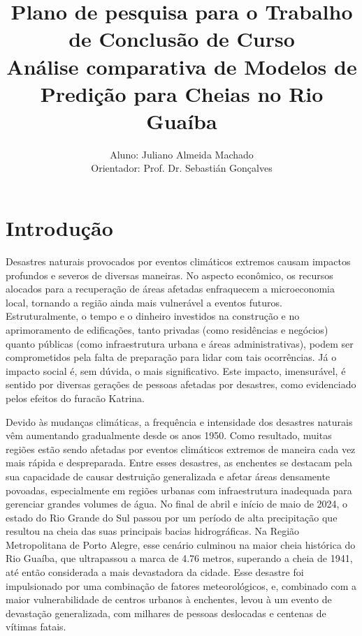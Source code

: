 \documentclass[
	12pt,				%
	openright,			%
	a4paper,			%
	english,			%
	french,				%
	spanish,			%
	brazil				%
	]{article}
\title{Plano de pesquisa para o Trabalho de Conclusão de Curso\\\large Análise comparativa de Modelos de Predição para Cheias no Rio Guaíba}
\author{Aluno: Juliano Almeida Machado \\
Orientador: Prof. Dr. Sebastián Gonçalves}
\date{}
\begin{document}
\maketitle

\section{Introdução}
Desastres naturais provocados por eventos climáticos extremos causam impactos profundos e severos de diversas maneiras. 
No aspecto econômico, os recursos alocados para a recuperação de áreas afetadas enfraquecem a microeconomia local, 
tornando a região ainda mais vulnerável a eventos futuros. Estruturalmente, o tempo e o dinheiro investidos na 
construção e no aprimoramento de edificações, tanto privadas (como residências e negócios) quanto públicas (como 
infraestrutura urbana e áreas administrativas), podem ser comprometidos pela falta de preparação para lidar com tais 
ocorrências. Já o impacto social é, sem dúvida, o mais significativo. Este impacto, imensurável, é sentido por diversas 
gerações de pessoas afetadas por desastres, como evidenciado pelos efeitos do furacão Katrina\cite{reardon}\cite{neria}.

Devido às mudanças climáticas, a frequência e intensidade dos desastres naturais vêm aumentando gradualmente desde os 
anos 1950\cite{dunn}. Como resultado, muitas regiões estão sendo afetadas por eventos climáticos extremos de maneira 
cada vez mais rápida e despreparada. Entre esses desastres, as enchentes se destacam pela sua capacidade de causar 
destruição generalizada e afetar áreas densamente povoadas, especialmente em regiões urbanas com infraestrutura 
inadequada para gerenciar grandes volumes de água. No final de abril e início de maio de 2024, o estado do Rio Grande do 
Sul passou por um período de alta precipitação que resultou na cheia das suas principais bacias hidrográficas. Na Região 
Metropolitana de Porto Alegre, esse cenário culminou na maior cheia histórica do Rio Guaíba, que ultrapassou a marca de 
4.76 metros, superando a cheia de 1941, até então considerada a mais devastadora da cidade\cite{dep}. Esse desastre foi 
impulsionado por uma combinação de fatores meteorológicos, e, combinado com a maior vulnerabilidade de centros urbanos à 
enchentes\cite{yang}\cite{hammond}\cite{zhang}\cite{pereira}, levou à um evento de devastação generalizada, com milhares 
de pessoas deslocadas e centenas de vítimas fatais\cite{alcantara}. 
\end{document}
